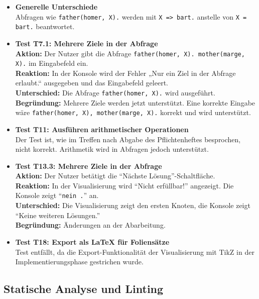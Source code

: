 \documentclass[parskip=full,11pt,twoside]{scrartcl}
\begin{document}
\begin{itemize}
  \item \textbf{Generelle Unterschiede}\\
      Abfragen wie \texttt{father(homer, X).} werden mit \texttt{X => bart.} anstelle von \texttt{X = bart.} beantwortet.

  \item \textbf{Test T7.1: Mehrere Ziele in der Abfrage}\\
      \textbf{Aktion:} Der Nutzer gibt die Abfrage \texttt{father(homer, X). mother(marge, X).} im Eingabefeld ein.\\
      \textbf{Reaktion:} In der Konsole wird der Fehler „Nur ein Ziel in der Abfrage erlaubt.“ ausgegeben und das Eingabefeld geleert.\\
      \textbf{Unterschied:} Die Abfrage \texttt{father(homer, X).} wird ausgeführt.\\
      \textbf{Begründung:} Mehrere Ziele werden jetzt unterstützt. Eine korrekte Eingabe wäre \texttt{father(homer, X), mother(marge, X).} korrekt und wird unterstützt.

  \item \textbf{Test T11: Ausführen arithmetischer Operationen}\\
      Der Test ist, wie im Treffen nach Abgabe des Pflichtenheftes besprochen, nicht korrekt. Arithmetik wird in Abfragen jedoch unterstützt.

  \item \textbf{Test T13.3: Mehrere Ziele in der Abfrage}\\
      \textbf{Aktion:} Der Nutzer betätigt die \enquote{Nächste Lösung}-Schaltfläche.\\
      \textbf{Reaktion:} In der Visualisierung wird \enquote{Nicht erfüllbar!} angezeigt. Die Konsole zeigt \enquote{\texttt{nein .}} an.\\
      \textbf{Unterschied:} Die Visualisierung zeigt den ersten Knoten, die Konsole zeigt \enquote{Keine weiteren Lösungen.}\\
      \textbf{Begründung:} Änderungen an der Abarbeitung.

  \item \textbf{Test T18: Export als LaTeX für Foliensätze}\\
      Test entfällt, da die Export-Funktionalität der Visualisierung mit TikZ in der Implementierungsphase gestrichen wurde.\\
\end{itemize}

\subsection{Statische Analyse und Linting}
\end{document}

